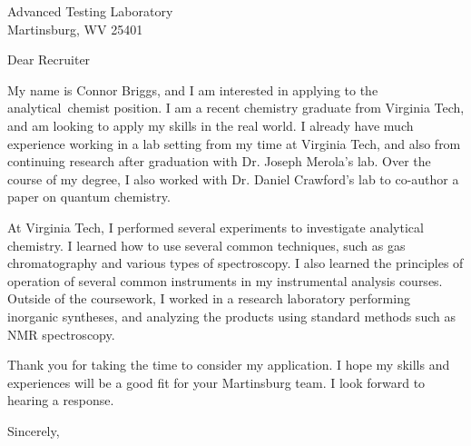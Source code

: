 \documentclass[12pt]{letter}
\author{Connor Briggs}
\begin{document}
\begin{letter}{Advanced Testing Laboratory\\Martinsburg, WV 25401}

  \opening{Dear Recruiter}

   My name is Connor Briggs, and I am interested in applying to the analytical~chemist position. I am a recent chemistry graduate from Virginia Tech, and am looking to apply my skills in the real world. I already have much experience working in a lab setting from my time at Virginia Tech, and also from continuing research after graduation with Dr. Joseph Merola's lab. Over the course of my degree, I also worked with Dr. Daniel Crawford's lab to co-author a paper on quantum chemistry.


   At Virginia Tech, I performed several experiments to investigate analytical chemistry. I learned how to use several common techniques, such as gas chromatography and various types of spectroscopy. I also learned the principles of operation of several common instruments in my instrumental analysis courses. Outside of the coursework, I worked in a research laboratory performing inorganic syntheses, and analyzing the products using standard methods such as NMR spectroscopy.
  
  
  Thank you for taking the time to consider my application. I hope my skills and experiences will be a good fit for your Martinsburg team. I look forward to hearing a response.
\closing{Sincerely,}
  
\end{letter}
\end{document}
